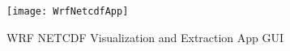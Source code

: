 

\begin{figure}[H]
\centering
\texttt{[image: WrfNetcdfApp]}
\caption{WRF NETCDF Visualization and Extraction App GUI}
\label{figApp6_1} %
\end{figure}